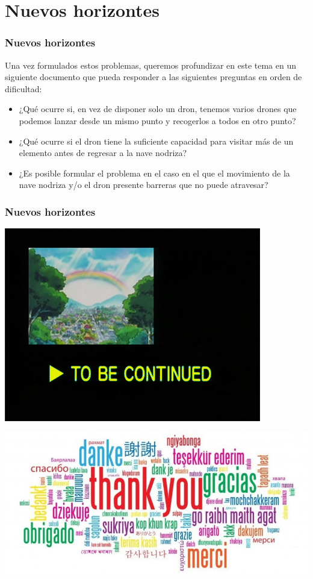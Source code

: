 \documentclass[slidestop,usepdftitle=false, xcolor=table]{beamer}
\begin{document}
	\section{Nuevos horizontes}
	\begin{frame}
		\frametitle{Nuevos horizontes}
		Una vez formulados estos problemas, queremos profundizar en este tema en un siguiente documento que pueda responder a las siguientes preguntas en orden de dificultad:
		\begin{itemize}
			\item ¿Qué ocurre si, en vez de disponer solo un dron, tenemos varios drones que podemos lanzar desde un mismo punto y recogerlos a todos en otro punto?
			\pause
			\item ¿Qué ocurre si el dron tiene la suficiente capacidad para visitar más de un elemento antes de regresar a la nave nodriza?
			\pause
			\item ¿Es posible formular el problema en el caso en el que el movimiento de la nave nodriza y/o el dron presente barreras que no puede atravesar?
		\end{itemize}
	\end{frame}

	\begin{frame}
		\frametitle{Nuevos horizontes}
		\begin{center}
			\includegraphics[width=0.5\linewidth]{continuara}
		\end{center}
	\end{frame}

	\begin{frame}
		\vspace{1.5cm}
		\hspace{1.5cm}
		\includegraphics[width=0.7\linewidth]{gracias}
	\end{frame}
\end{document}
